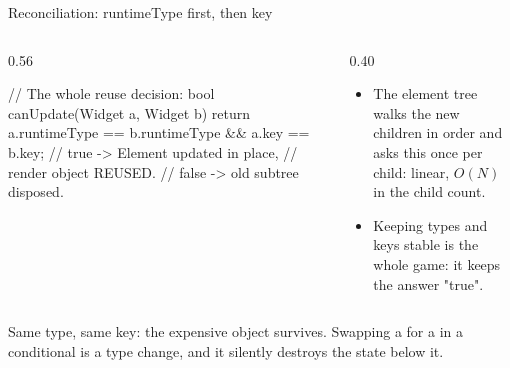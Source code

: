 \documentclass[10pt,aspectratio=169,t]{beamer}
\begin{document}
\begin{frame}[fragile,eyebrow=Rendering]{Reconciliation: runtimeType first, then key}
  \begin{columns}[T]
    \begin{column}{0.56\textwidth}
\begin{dart}
// The whole reuse decision:
bool canUpdate(Widget a, Widget b) {
  return a.runtimeType == b.runtimeType
      && a.key == b.key;
}
// true  -> Element updated in place,
//          render object REUSED.
// false -> old subtree disposed.
\end{dart}
    \end{column}
    \begin{column}{0.40\textwidth}
      \begin{itemize}
        \item The element tree walks the new children in order and asks this once per child: linear, \(O(N)\) in the child count.
        \item Keeping types and keys stable is the whole game: it keeps the answer "true".
      \end{itemize}
    \end{column}
  \end{columns}
  \begin{takeaway}{Same type, same key: the expensive object survives.}
    Swapping a  for a  in a conditional is a type change, and it silently destroys the state below it.
  \end{takeaway}
\end{frame}
\end{document}
